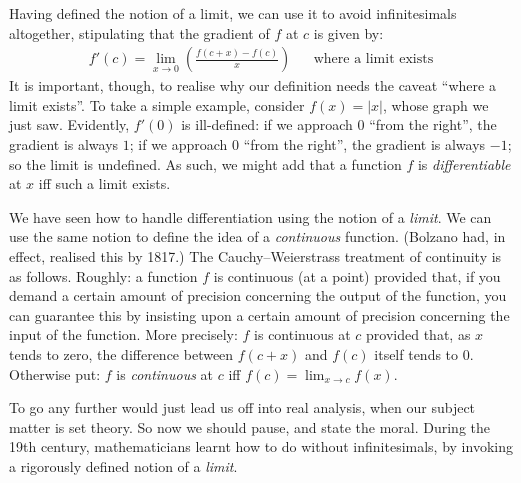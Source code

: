 \documentclass[../../../include/open-logic-section]{subfiles}
\begin{document}
Having defined the notion of a limit, we can use it to avoid infinitesimals altogether, stipulating that the gradient of $f$ at $c$ is given by:
\begin{align*}
	{f}'(c) = \lim_{x \rightarrow 0}\left(\frac{f(c +x) - f(c)}{x}\right) & & \text{where a limit exists}
\end{align*}
It is important, though, to realise why our definition needs the caveat ``where a limit exists''. To take a simple example, consider $f(x) = |x|$, whose graph we just saw. Evidently, $f'(0)$ is ill-defined: if we approach $0$ ``from the right'', the gradient is always $1$; if we approach $0$ ``from the right'', the gradient is always $-1$; so the limit is undefined. As such, we might add that a function $f$ is \emph{differentiable} at $x$ iff such a limit exists.

We have seen how to handle differentiation using the notion of a \emph{limit}. We can use the same notion to define the idea of a \emph{continuous} function. (Bolzano had, in effect, realised this by 1817.) The Cauchy--Weierstrass treatment of continuity is as follows. Roughly: a function $f$ is continuous (at a point) provided that, if you demand a certain amount of precision concerning the output of the function, you can guarantee this by insisting upon a certain amount of precision concerning the input of the function. More precisely: $f$ is continuous at $c$ provided that, as $x$ tends to zero, the difference between $f(c + x)$ and $f(c)$ itself tends to $0$. Otherwise put: $f$ is \emph{continuous} at $c$ iff $f(c) = \lim_{x \rightarrow c} f(x)$. 

To go any further would just lead us off into real analysis, when our subject matter is set theory. So now we should pause, and state the moral. During the 19th century, mathematicians learnt how to do without infinitesimals, by invoking a rigorously defined notion of a \emph{limit}.
\end{document}
